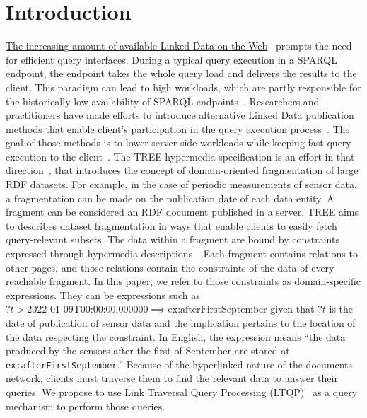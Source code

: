 \section{Introduction}



\href{https://lod-cloud.net/#diagram}{The increasing amount of available Linked Data on the Web}~\cite{Ermilov2013} prompts the need for efficient query interfaces.
During a typical query execution in a SPARQL endpoint, the endpoint takes the whole query load and delivers the results to the client.
This paradigm can lead to high workloads, which are partly responsible for the historically low availability of SPARQL endpoints~\cite{aranda2013}.
Researchers and practitioners have made efforts to introduce alternative Linked Data publication methods that enable client's participation in the query execution process~\cite{Verborgh2016TriplePF}.
The goal of those methods is to lower server-side workloads while keeping fast query execution to the client~\cite{Azzam2021}.
The TREE hypermedia specification is an effort in that direction~\cite{ColpaertMaterializedTREE, lancker2021LDS}, that introduces the concept of domain-oriented fragmentation of large RDF datasets.
For example, in the case of periodic measurements of sensor data, a fragmentation can be made on the publication date of each data entity.
A fragment can be considered an RDF document published in a server.
TREE aims to describes dataset fragmentation in ways that enable clients to easily fetch query-relevant subsets.
The data within a fragment are bound by constraints expressed through hypermedia descriptions~\cite{thomasFieldingPhdThesis}.
Each fragment contains relations to other pages, and those relations contain the constraints of the data of every reachable fragment.
In this paper, we refer to those constraints as domain-specific expressions.
They can be expressions such as $?t > \text{2022-01-09T00:00:00.000000} \implies \text{ex:afterFirstSeptember}$ 
given that $?t$ is the date of publication of sensor data and the implication pertains to the location of the data respecting the constraint.
In English, the expression means ``the data produced by the sensors after the first of September are stored at \texttt{ex:afterFirstSeptember}.''
Because of the hyperlinked nature of the documents network, clients must traverse them to find the relevant data to answer their queries.
We propose to use Link Traversal Query Processing (LTQP)~\cite{Hartig2016} as a query mechanism to perform those queries.

